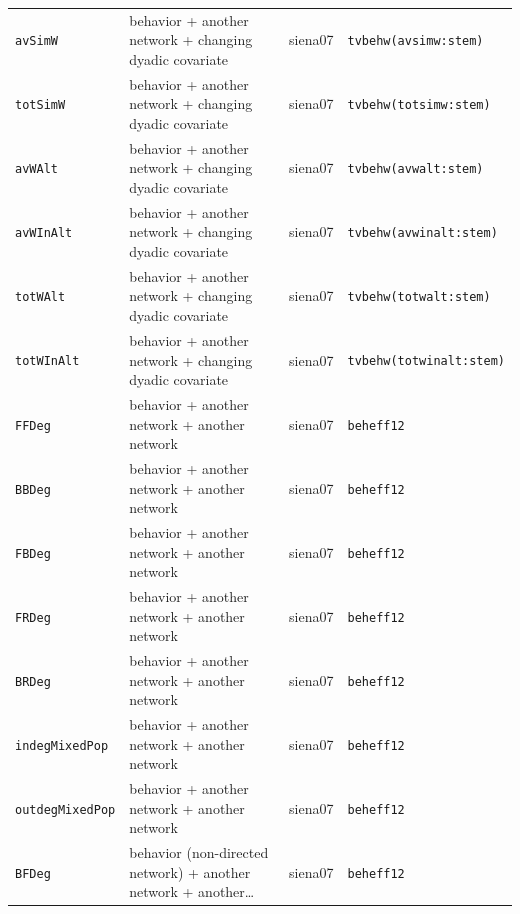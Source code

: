\begin{longtable}{@{}p{2.6cm}p{3.2cm}p{2.9cm}p{5.4cm}@{}}
\texttt{avSimW} & behavior + another network + changing dyadic covariate & siena07 & \texttt{tvbehw(avsimw:stem)}\\
\texttt{totSimW} & behavior + another network + changing dyadic covariate & siena07 & \texttt{tvbehw(totsimw:stem)}\\
\texttt{avWAlt} & behavior + another network + changing dyadic covariate & siena07 & \texttt{tvbehw(avwalt:stem)}\\
\texttt{avWInAlt} & behavior + another network + changing dyadic covariate & siena07 & \texttt{tvbehw(avwinalt:stem)}\\
\texttt{totWAlt} & behavior + another network + changing dyadic covariate & siena07 & \texttt{tvbehw(totwalt:stem)}\\
\texttt{totWInAlt} & behavior + another network + changing dyadic covariate & siena07 & \texttt{tvbehw(totwinalt:stem)}\\
\texttt{FFDeg} & behavior + another network + another network & siena07 & \texttt{beheff12}\\
\texttt{BBDeg} & behavior + another network + another network & siena07 & \texttt{beheff12}\\
\texttt{FBDeg} & behavior + another network + another network & siena07 & \texttt{beheff12}\\
\texttt{FRDeg} & behavior + another network + another network & siena07 & \texttt{beheff12}\\
\texttt{BRDeg} & behavior + another network + another network & siena07 & \texttt{beheff12}\\
\texttt{indegMixedPop} & behavior + another network + another network & siena07 & \texttt{beheff12}\\
\texttt{outdegMixedPop} & behavior + another network + another network & siena07 & \texttt{beheff12}\\
\texttt{BFDeg} & behavior (non-directed network) + another network + another… & siena07 & \texttt{beheff12}\\
\bottomrule
\end{longtable}
\normalsize

